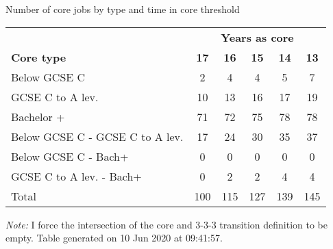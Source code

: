 \begin{center}
\begin{threeparttable}[!h]
\caption{Number of core jobs by type and time in core threshold}
\begin{tabular}{lccccc}
\toprule
\toprule
& \multicolumn{5}{c}{\textbf{Years as core}} \\
\cline{2-6}
\textbf{Core type}&\multicolumn{1}{c}{\textbf{17}}&\multicolumn{1}{c}{\textbf{16}}&\multicolumn{1}{c}{\textbf{15}}&\multicolumn{1}{c}{\textbf{14}}&\multicolumn{1}{c}{\textbf{13}} \\
\midrule
\midrule
Below GCSE C&2&4&4&5&7 \\
GCSE C to A lev.&10&13&16&17&19 \\
Bachelor +&71&72&75&78&78 \\
Below GCSE C - GCSE C to A lev.&17&24&30&35&37 \\
Below GCSE C - Bach+&0&0&0&0&0 \\
GCSE C to A lev. - Bach+&0&2&2&4&4 \\
Total&100&115&127&139&145 \\
\bottomrule
\bottomrule
\end{tabular}
\begin{tablenotes}
\item \footnotesize \textit{Note:} I force the intersection of the core and 3-3-3 transition definition to be empty. Table generated on 10 Jun 2020 at 09:41:57.
\end{tablenotes}
\end{threeparttable}
\end{center}
